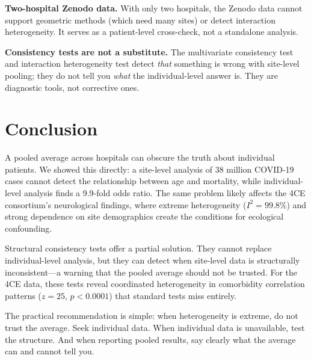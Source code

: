 \documentclass{article}
\begin{document}
\textbf{Two-hospital Zenodo data.}  With only two hospitals, the Zenodo data
cannot support geometric methods (which need many sites) or detect interaction
heterogeneity.  It serves as a patient-level cross-check, not a standalone
analysis.

\textbf{Consistency tests are not a substitute.}  The multivariate consistency
test and interaction heterogeneity test detect \emph{that} something is wrong
with site-level pooling; they do not tell you \emph{what} the
individual-level answer is.  They are diagnostic tools, not corrective ones.


\section{Conclusion}

A pooled average across hospitals can obscure the truth about individual
patients.  We showed this directly: a site-level analysis of 38 million
COVID-19 cases cannot detect the relationship between age and mortality, while
individual-level analysis finds a 9.9-fold odds ratio.  The same problem
likely affects the 4CE consortium's neurological findings, where extreme
heterogeneity ($I^2 = 99.8\%$) and strong dependence on site demographics
create the conditions for ecological confounding.

Structural consistency tests offer a partial solution.  They cannot replace
individual-level analysis, but they can detect when site-level data is
structurally inconsistent---a warning that the pooled average should not be
trusted.  For the 4CE data, these tests reveal coordinated heterogeneity
in comorbidity correlation patterns ($z = 25$, $p < 0.0001$) that standard
tests miss entirely.

The practical recommendation is simple: when heterogeneity is extreme, do not
trust the average.  Seek individual data.  When individual data is
unavailable, test the structure.  And when reporting pooled results, say
clearly what the average can and cannot tell you.




\end{document}
